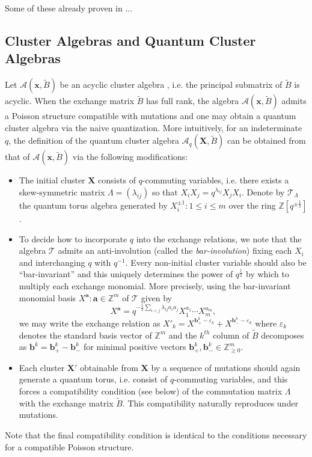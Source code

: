 \documentclass{amsart}
\newcommand{\bfa}{\mathbf{a}}
\newcommand{\bfb}{\mathbf{b}}
\newcommand{\bfx}{\mathbf{x}}
\newcommand{\bfX}{\mathbf{X}}
\newcommand{\cA}{\mathcal{A}}
\newcommand{\cT}{\mathcal{T}}
\newcommand{\half}{{\frac{1}{2}}}
\newcommand{\ZZ}{\mathbb{Z}}
\begin{document}
  Some of these already proven in \cite{demonet}...

  \subsection{Cluster  Algebras and Quantum Cluster Algebras} Let $\cA(\bfx,\tilde B)$ be an acyclic cluster algebra \cite{berenstein-fomin-zelevinsky}, i.e. the principal submatrix of $\tilde B$ is acyclic.  
  When the exchange matrix $\tilde B$ has full rank, the algebra $\cA(\bfx,\tilde B)$ admits a Poisson structure compatible with mutations \cite{gekhtman-shapiro-vainshtein} and one may obtain a quantum cluster algebra via the naive quantization.  
  More intuitively, for an indeterminate $q$, the definition of the quantum cluster algebra $\cA_q(\bfX,\tilde B)$ can be obtained from that of $\cA(\bfx,\tilde B)$ via the following modifications:
  \begin{itemize}
    \item The initial cluster $\bfX$ consists of $q$-commuting variables, i.e. there exists a skew-symmetric matrix $\Lambda=(\lambda_{ij})$ so that $X_iX_j=q^{\lambda_{ij}}X_jX_i$.  
    Denote by $\cT_\Lambda$ the quantum torus algebra generated by $X_i^{\pm1}:1\le i\le m$ over the ring $\ZZ[q^{\pm\half}]$.
    \item To decide how to incorporate $q$ into the exchange relations, we note that the algebra $\cT$ admits an anti-involution (called the \emph{bar-involution}) fixing each $X_i$ and interchanging $q$ with $q^{-1}$.
    Every non-initial cluster variable should also be ``bar-invariant'' and this uniquely determines the power of $q^\half$ by which to multiply each exchange monomial.  
    More precisely, using the bar-invariant monomial basis $X^\bfa:\bfa\in\ZZ^m$ of $\cT$ given by
    \[X^\bfa=q^{-\half\sum\limits_{i<j}\lambda_{ij}a_ia_j}X_1^{a_1}\cdots X_m^{a_m},\]
    we may write the exchange relation as $X'_k=X^{\bfb_+^k-\varepsilon_k}+X^{\bfb_-^k-\varepsilon_k}$ where $\varepsilon_k$ denotes the standard basis vector of $\ZZ^m$ and the $k^{th}$ column of $\tilde B$ decomposes as $\bfb^k=\bfb^k_+-\bfb^k_-$ for minimal positive vectors $\bfb^k_+,\bfb^k_-\in\ZZ_{\ge0}^m$.
    \item Each cluster $\bfX'$ obtainable from $\bfX$ by a sequence of mutations should again generate a quantum torus, i.e. consist of $q$-commuting variables, and this forces a compatibility condition (see below) of the commutation matrix $\Lambda$ with the exchange matrix $\tilde B$.
    This compatibility naturally reproduces under mutations.
  \end{itemize}
  Note that the final compatibility condition is identical to the conditions necessary for a compatible Poisson structure.
  
\end{document}
